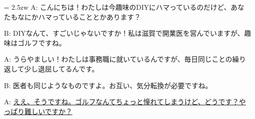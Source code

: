\documentclass[11pt]{amsart}
\title{}
\author{}
\newenvironment{hangall}[1]{\hangindent = 2.5zw\everypar{\hangindent = 2.5zw}}{}
\begin{document}
\maketitle
\begin{hangall}{}%
A: こんにちは！わたしは今趣味のDIYにハマっているのだけど、あなたもなにかハマっていることとかあります？

B: DIYなんて、すごいじゃないですか！私は滋賀で開業医を営んでいますが、趣味はゴルフですね。

A: うらやましい！わたしは事務職に就いているんですが、毎日同じことの繰り返して少し退屈してるんです。

B: 医者も同じようなものですよ。お互い、気分転換が必要ですね。

A: \ul{ええ、そうですね。ゴルフなんてちょっと憧れてしまうけど、どうです？やっぱり難しいですか？}\end{hangall}
\end{document}
